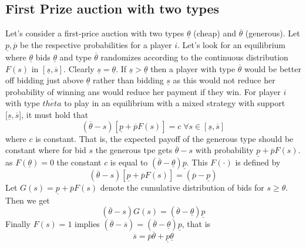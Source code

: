 \documentclass[a4paper, 12pt]{article}
\theoremstyle{plain}
\theoremstyle{definition}
\theoremstyle{lemma}
\theoremstyle{remark}
\theoremstyle{corollary}
\theoremstyle{example}
\begin{document}
	\subsection{First Prize auction with two types}
	Let's consider a first-price auction with two types $\underline{\theta}$ (cheap) and $\overline{\theta}$ (generous). Let $\underline{p}, \overline{p}$ be the respective probabilities for a player $i$. Let's look for an equilibrium where $\underline{\theta}$ bids $\underline{\theta}$ and type $\overline{\theta}$ randomizes according to the continuous distribution $F(s)$ in $[\underline{s},\overline{s}]$. Clearly $\underline{s} = \underline{\theta}$. If $\underline{s} > \underline{\theta}$ then a player with type $\overline{\theta}$ would be better off bidding just above $\underline{\theta}$ rather than bidding $\underline{s}$ as this would not reduce her probability of winning ans would reduce her payment if they win. For player $i$ with type $\overline{theta}$ to play in an equilibrium with a mixed strategy with support $[\underline{s},\overline{s}$], it must hold that \[(\overline{\theta}-s)[\underline{p}+\overline{p}F(s)] = c \; \forall s \in [\underline{s},\overline{s}]\] where $c$ is constant. That is, the expected payoff of the generous type should be constant where for bid $s$ the generous tpe gets $\overline{\theta}-s$ with probability $\underline{p}+ \overline{p}F(s)$. as $F(\underline{\theta}) = 0$ the constant $c$ is equal to $(\overline{\theta}-\underline{\theta})\underline{p}$. This $F(\cdot)$ is defined by \[(\overline{\theta} - s)[\underline{p}+\overline{p}F(s)] = (\overline{p}-\underline{p}) \]
	Let $G(s) = \underline{p}+\overline{p}F(s)$ denote the cumulative distribution of bids for $s\geq \theta$. Then we get \[(\overline{\theta}-s)G(s) = (\overline{\theta}-\underline{\theta})\underline{p}\] Finally $F(s) = 1$ implies $(\overline{\theta} - \overline{s}) = (\overline{\theta} - \underline{\theta})\underline{p}$, that is \[\overline{s} = \overline{p}\overline{\theta}+\underline{p}\underline{\theta}\]
\end{document}
